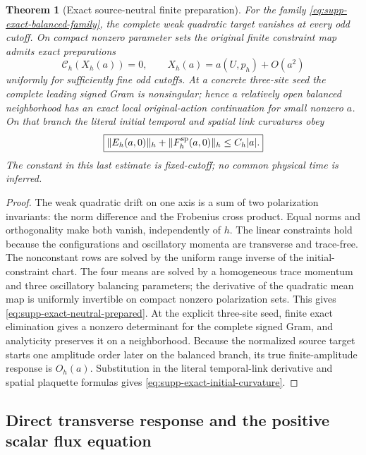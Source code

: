 \documentclass[11pt]{article}
\newtheorem{theorem}{Theorem}[section]
\theoremstyle{definition}
\theoremstyle{remark}
\begin{document}
\begin{theorem}[Exact source-neutral finite preparation]
\label{thm:supp-exact-neutral-preparation}
For the family \eqref{eq:supp-exact-balanced-family}, the complete weak
quadratic target vanishes at every odd cutoff.  On compact nonzero parameter
sets the original finite constraint map admits exact preparations
\begin{equation}
 \boxed{\mathscr C_h(X_h(a))=0,
 \qquad X_h(a)=a(U,p_h)+O(a^2)}
 \label{eq:supp-exact-neutral-prepared}
\end{equation}
uniformly for sufficiently fine odd cutoffs.  At a concrete three-site seed
the complete leading signed Gram is nonsingular; hence a relatively open
balanced neighborhood has an exact local original-action continuation for
small nonzero $a$.  On that branch the literal initial temporal and spatial
link curvatures obey
\begin{equation}
 \boxed{\|E_h(a,0)\|_h+\|F_h^{\rm sp}(a,0)\|_h\le C_h|a|.}
 \label{eq:supp-exact-initial-curvature}
\end{equation}
The constant in this last estimate is fixed-cutoff; no common physical time
is inferred.
\end{theorem}
\begin{proof}
The weak quadratic drift on one axis is a sum of two polarization invariants:
the norm difference and the Frobenius cross product.  Equal norms and
orthogonality make both vanish, independently of $h$.  The linear constraints
hold because the configurations and oscillatory momenta are transverse and
trace-free.  The nonconstant rows are solved by the uniform range inverse of
the initial-constraint chart.  The four means are solved by a homogeneous
trace momentum and three oscillatory balancing parameters; the derivative of
the quadratic mean map is uniformly invertible on compact nonzero
polarization sets.  This gives \eqref{eq:supp-exact-neutral-prepared}.  At the
explicit three-site seed, finite exact elimination gives a nonzero determinant
for the complete signed Gram, and analyticity preserves it on a neighborhood.
Because the normalized source target starts one amplitude order later on the
balanced branch, its true finite-amplitude response is $O_h(a)$.  Substitution
in the literal temporal-link derivative and spatial plaquette formulas gives
\eqref{eq:supp-exact-initial-curvature}.
\end{proof}

\subsection{Direct transverse response and the positive scalar flux equation}
\end{document}
